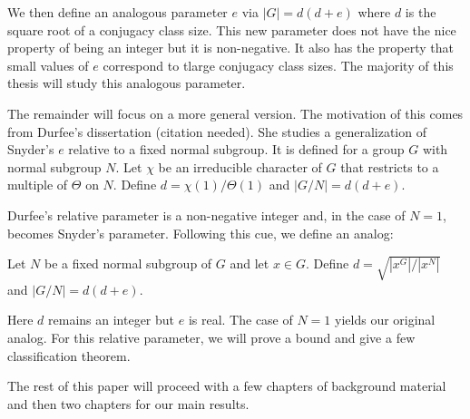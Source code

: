 \documentclass[main.tex]{subfiles}
\begin{document}
We then define an analogous parameter $e$ via $|G| = d(d+e)$ where $d$ is the square root of a conjugacy class size. This new parameter does not have the nice property of being an integer but it is non-negative. It also has the property that small values of $e$ correspond to tlarge conjugacy class sizes. The majority of this thesis will study this analogous parameter.

The remainder will focus on a more general version. The motivation of this comes from Durfee's dissertation (citation needed). She studies a generalization of Snyder's $e$ relative to a fixed normal subgroup. It is defined for a group $G$ with normal subgroup $N$. Let $\chi$ be an irreducible character of $G$ that restricts to a multiple of $\Theta$ on $N$. Define $d = \chi(1) / \Theta(1)$ and $|G/N| = d(d+e)$.

\noindent Durfee's relative parameter is a non-negative integer and, in the case of $N = 1$, becomes Snyder's parameter. Following this cue, we define an analog:

\hss

\begin{definition}
Let $N$ be a fixed normal subgroup of $G$ and let $x \in G$. Define $d = \sqrt{|x^G|/|x^N|}$ and $|G/N| = d(d+e)$.
\end{definition}

\noindent Here $d$ remains an integer but $e$ is real. The case of $N = 1$ yields our original analog. For this relative parameter, we will prove a bound and give a few classification theorem.

The rest of this paper will proceed with a few chapters of background material and then two chapters for our main results.
\end{document}
